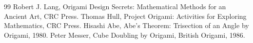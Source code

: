 
\begin{thebibliography}{99}
Robert J. Lang, Origami Design Secrets: Mathematical Methods for an Ancient Art, CRC Press.
Thomas Hull, Project Origami: Activities for Exploring Mathematics, CRC Press.
Hisashi Abe, Abe's Theorem: Trisection of an Angle by Origami, 1980.
Peter Messer, Cube Doubling by Origami, British Origami, 1986.

\end{thebibliography}
